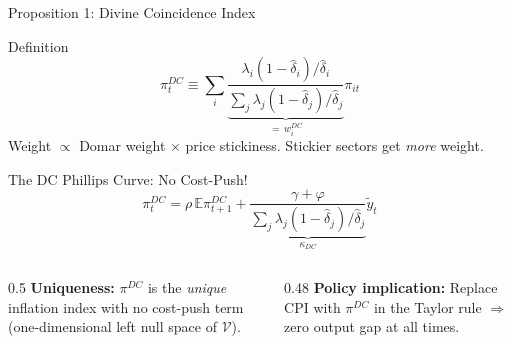 \documentclass[aspectratio=169]{beamer}
\begin{document}
\begin{frame}{Proposition 1: Divine Coincidence Index}

\begin{block}{Definition}
\begin{equation*}
    \pi_t^{DC} \equiv \sum_i \underbrace{\frac{\lambda_i(1-\hat{\delta}_i)/\hat{\delta}_i}{\sum_j \lambda_j(1-\hat{\delta}_j)/\hat{\delta}_j}}_{=\, w_i^{DC}} \pi_{it}
\end{equation*}
Weight $\propto$ Domar weight $\times$ price stickiness. Stickier sectors get \textit{more} weight.
\end{block}

\begin{exampleblock}{The DC Phillips Curve: No Cost-Push!}
\begin{equation*}
    \pi_t^{DC} = \rho\,\mathbb{E}\pi_{t+1}^{DC} + \underbrace{\frac{\gamma+\varphi}{\sum_j \lambda_j(1-\hat{\delta}_j)/\hat{\delta}_j}}_{\kappa_{DC}}\tilde{y}_t
\end{equation*}
\end{exampleblock}

\begin{columns}
\begin{column}{0.5\textwidth}
\textbf{Uniqueness:} $\pi^{DC}$ is the \textit{unique} inflation index with no cost-push term (one-dimensional left null space of $\mathcal{V}$).
\end{column}
\begin{column}{0.48\textwidth}
\textbf{Policy implication:} Replace CPI with $\pi^{DC}$ in the Taylor rule $\Rightarrow$ zero output gap at all times.
\end{column}
\end{columns}
\end{frame}
\end{document}
